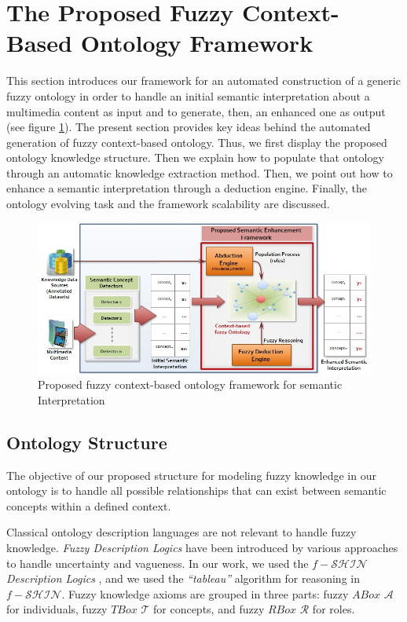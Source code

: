 	\section{The Proposed Fuzzy Context-Based Ontology Framework}
		\label{c2_2}
		This section introduces our framework for an automated construction of a generic fuzzy ontology in 
		order to handle an initial semantic interpretation about a multimedia content as input and to generate, 
		then, an enhanced one as output (see figure \ref{fig:system}). The present section provides key ideas 
		behind the automated generation of fuzzy context-based ontology. Thus, we first display the proposed 
		ontology knowledge structure. Then we explain how to populate that ontology through an automatic knowledge 
		extraction method. Then, we point out how to enhance a semantic interpretation through a deduction engine.
		Finally, the ontology evolving task and the framework scalability are discussed. 

		\begin{figure}[t]	
			\centering
			\includegraphics[width=\textwidth]{graphics/systeme}
			\caption{Proposed fuzzy context-based ontology framework for semantic Interpretation}
			\label{fig:system}
		\end{figure}

		
		\subsection{Ontology Structure}
			The objective of our proposed structure for modeling fuzzy knowledge in our ontology 
			is to handle all possible relationships that can exist between semantic concepts 
			within a defined context.

			Classical ontology description languages are not relevant to handle fuzzy knowledge.
			\emph{Fuzzy Description Logics} have been introduced by various approaches to handle 
			uncertainty and vagueness. In our work, we used the $f-\mathcal{SHIN}$ 
			\emph{Description Logics} \citep{Stoilos2005}, 
			and we used the \emph{``tableau''} algorithm \citep{Horrocks2005} for reasoning in
			$f-\mathcal{SHIN}$.  Fuzzy knowledge axioms are grouped in three parts: 
			fuzzy $ABox$ $\mathcal{A}$ for individuals, fuzzy $TBox$ $\mathcal{T}$ for concepts, 
			and fuzzy $RBox$ $\mathcal{R}$ for roles.

